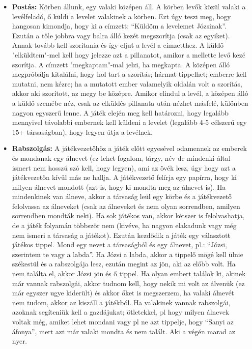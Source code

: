 \documentclass[a4paper, 12pt, twoside, openright]{article}
\begin{document}
\begin{itemize}
\item \textbf{Postás:} Körben állunk, egy valaki középen áll. A körben levők közül valaki a levélfeladó, ő küldi a levelet valakinek a körben. Ezt úgy teszi meg, hogy hangosan kimondja, hogy ki a címzett: ``Küldöm a levelemet Józsinak''. Ezután a tőle jobbra vagy balra álló kezét megszorítja (csak az egyiket). Annak tovább kell szorítania és így eljut a levél a címzetthez. A küldő "elküldtem"-mel kell hogy jelezze azt a pillanatot, amikor a mellette levő kezé szorítja. A címzett "megkaptam"-mal jelzi, ha megkapta. A középen álló megpróbálja kitalálni, hogy hol tart a szorítás; hármat tippelhet; emberre kell mutatni, nem kézre; ha a mutatott ember valamelyik oldalán volt a szorítás, akkor aki szorított, az megy be középre. Amikor elindul a levél, a középen álló a küldő szemébe néz, csak az elküldés pillanata után nézhet másfelé, különben nagyon egyszerű lenne. A játék elején meg kell határozni, hogy legalább mennyivel távolabbi embernek kell küldeni a levelet (legalább 4-5 célszerű egy 15+ társaságban), hogy legyen útja a levélnek.

\item \textbf{Rabszolgás:} A játékvezetőhöz a játék előtt egyesével odamennek az emberek és mondanak egy álnevet (ez lehet fogalom, tárgy, név de mindenki által ismert nem hosszú szó kell, hogy legyen), ami az övék lesz, úgy hogy azt a játékvezetőn kívül más ne hallja. A játékvezető felírja egy papírra, hogy ki milyen álnevet mondott (azt is, hogy ki mondta meg az álnevet is). Ha mindenkinek van álneve, akkor a társaság leül egy körbe és a játékvezető felolvassa az álneveket (csak az álneveket és nem olyan sorrendben, amilyen sorrendben mondták neki). Ha sok játékos van, akkor kétszer is felolvashatja, de a játék folyamán többször nem (kivéve, ha nagyon elakadunk vagy még nem ismeri a társaság a játékot). Ezután kezdődik a játék egy választott játékos tippel. Mond egy nevet a társaságból és egy álnevet, pl.: ``Józsi, szerintem te vagy a labda''. Ha Józsi a labda, akkor a tippelő mögé kell ülnie székestül és a rabszolgája lesz, ezután megint az jön, aki az előbb volt. Ha nem találta el, akkor Józsi jön és ő tippel. Ha olyan embert találok ki, akinek már vannak rabszolgái, akkor tudnom kell, hogy nekik mi volt az álvenük (ez már egyszer ugye kiderült) és akkor őket is megszerzem, ha valaki álnevét nem tudom, akkor az kiszáll a játékból. Ha valakinek vannak rabszolgái, azoknak segíteniük kell a gazdájukat; ötletekkel, pl hogy milyen álnevek voltak még, amiket lehet mondani vagy pl ne azt tippelje, hogy ``Sanyi az áfonya'', mert azt már valaki mondta és nem talált. Aki a végén marad az nyer.


\end{itemize}
\end{document}
